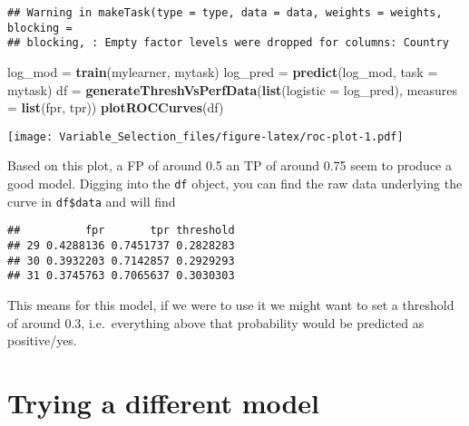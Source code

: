 \documentclass[]{article}
\newenvironment{Shaded}{\begin{snugshade}}{\end{snugshade}}
\newcommand{\DataTypeTok}[1]{\textcolor[rgb]{0.13,0.29,0.53}{#1}}
\newcommand{\DecValTok}[1]{\textcolor[rgb]{0.00,0.00,0.81}{#1}}
\newcommand{\KeywordTok}[1]{\textcolor[rgb]{0.13,0.29,0.53}{\textbf{#1}}}
\newcommand{\NormalTok}[1]{#1}
\newcommand{\OperatorTok}[1]{\textcolor[rgb]{0.81,0.36,0.00}{\textbf{#1}}}
\newcommand{\StringTok}[1]{\textcolor[rgb]{0.31,0.60,0.02}{#1}}
\begin{document}
\begin{verbatim}
## Warning in makeTask(type = type, data = data, weights = weights, blocking =
## blocking, : Empty factor levels were dropped for columns: Country
\end{verbatim}

\begin{Shaded}
\begin{Highlighting}[]
\NormalTok{log_mod =}\StringTok{ }\KeywordTok{train}\NormalTok{(mylearner, mytask)}
\NormalTok{log_pred =}\StringTok{ }\KeywordTok{predict}\NormalTok{(log_mod, }\DataTypeTok{task =}\NormalTok{ mytask)}
\NormalTok{df =}\StringTok{ }\KeywordTok{generateThreshVsPerfData}\NormalTok{(}\KeywordTok{list}\NormalTok{(}\DataTypeTok{logistic =}\NormalTok{ log_pred), }\DataTypeTok{measures =} \KeywordTok{list}\NormalTok{(fpr, tpr))}
\KeywordTok{plotROCCurves}\NormalTok{(df)}
\end{Highlighting}
\end{Shaded}

\texttt{[image: Variable\_Selection\_files/figure-latex/roc-plot-1.pdf]}

Based on this plot, a FP of around 0.5 an TP of around 0.75 seem to
produce a good model. Digging into the \texttt{df} object, you can find
the raw data underlying the curve in \texttt{df\$data} and will find

\begin{Shaded}
\end{Shaded}

\begin{verbatim}
##          fpr       tpr threshold
## 29 0.4288136 0.7451737 0.2828283
## 30 0.3932203 0.7142857 0.2929293
## 31 0.3745763 0.7065637 0.3030303
\end{verbatim}

This means for this model, if we were to use it we might want to set a
threshold of around 0.3, i.e.~everything above that probability would be
predicted as positive/yes.

\hypertarget{trying-a-different-model}{%
\section{Trying a different model}\label{trying-a-different-model}}
\end{document}
